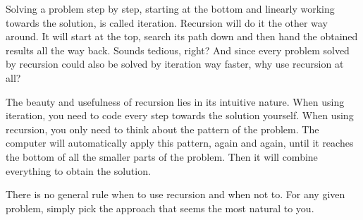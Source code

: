 
Solving a problem step by step, starting at the bottom and linearly working towards the solution, is called iteration. Recursion will do it the other way around. It will start at the top, search its path down and then hand the obtained results all the way back. Sounds tedious, right? And since every problem solved by recursion could also be solved by iteration way faster, why use recursion at all?

The beauty and usefulness of recursion lies in its intuitive nature. When using iteration, you need to code every step towards the solution yourself. When using recursion, you only need to think about the pattern of the problem. The computer will automatically apply this pattern, again and again, until it reaches the bottom of all the smaller parts of the problem. Then it will combine everything to obtain the solution.

There is no general rule when to use recursion and when not to. For any given problem, simply pick the approach that seems the most natural to you.

